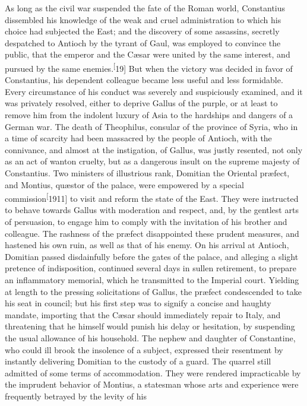 As long as the civil war suspended the fate of the Roman world,
Constantius dissembled his knowledge of the weak and cruel
administration to which his choice had subjected the East; and
the discovery of some assassins, secretly despatched to Antioch
by the tyrant of Gaul, was employed to convince the public, that
the emperor and the Cæsar were united by the same interest, and
pursued by the same enemies.\textsuperscript[19] But when the victory was decided
in favor of Constantius, his dependent colleague became less
useful and less formidable. Every circumstance of his conduct was
severely and suspiciously examined, and it was privately
resolved, either to deprive Gallus of the purple, or at least to
remove him from the indolent luxury of Asia to the hardships and
dangers of a German war. The death of Theophilus, consular of the
province of Syria, who in a time of scarcity had been massacred
by the people of Antioch, with the connivance, and almost at the
instigation, of Gallus, was justly resented, not only as an act
of wanton cruelty, but as a dangerous insult on the supreme
majesty of Constantius. Two ministers of illustrious rank,
Domitian the Oriental præfect, and Montius, quæstor of the
palace, were empowered by a special commission\textsuperscript[1911] to visit and
reform the state of the East. They were instructed to behave
towards Gallus with moderation and respect, and, by the gentlest
arts of persuasion, to engage him to comply with the invitation
of his brother and colleague. The rashness of the præfect
disappointed these prudent measures, and hastened his own ruin,
as well as that of his enemy. On his arrival at Antioch, Domitian
passed disdainfully before the gates of the palace, and alleging
a slight pretence of indisposition, continued several days in
sullen retirement, to prepare an inflammatory memorial, which he
transmitted to the Imperial court. Yielding at length to the
pressing solicitations of Gallus, the præfect condescended to
take his seat in council; but his first step was to signify a
concise and haughty mandate, importing that the Cæsar should
immediately repair to Italy, and threatening that he himself
would punish his delay or hesitation, by suspending the usual
allowance of his household. The nephew and daughter of
Constantine, who could ill brook the insolence of a subject,
expressed their resentment by instantly delivering Domitian to
the custody of a guard. The quarrel still admitted of some terms
of accommodation. They were rendered impracticable by the
imprudent behavior of Montius, a statesman whose arts and
experience were frequently betrayed by the levity of his

